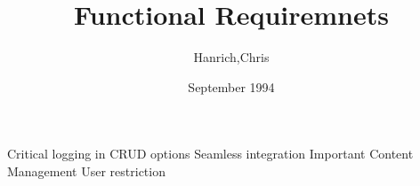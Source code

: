 \documentclass{article}
\title{Functional Requiremnets}
\author{Hanrich,Chris}
\date{September 1994}
\begin{document}
\maketitle
Critical
	logging in
	CRUD options
	Seamless integration
Important
	Content Management
	User restriction
	
	
\end{document}
